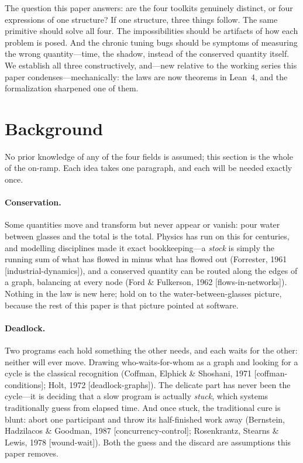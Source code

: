 \documentclass[11pt]{article}
\begin{document}
The question this paper answers: are the four toolkits genuinely
distinct, or four expressions of one structure? If one structure, three
things follow. The same primitive should solve all four. The
impossibilities should be artifacts of how each problem is posed. And
the chronic tuning bugs should be symptoms of measuring the wrong
quantity---time, the shadow, instead of the conserved quantity itself.
We establish all three constructively, and---new relative to the
working series this paper condenses---mechanically: the laws are now
theorems in Lean~4, and the formalization sharpened one of them.

\section{Background}
\label{sec:background}

No prior knowledge of any of the four fields is assumed; this section
is the whole of the on-ramp. Each idea takes one paragraph, and each
will be needed exactly once.

\paragraph{Conservation.} Some quantities move and transform but never
appear or vanish: pour water between glasses and the total is the
total. Physics has run on this for centuries, and modelling
disciplines made it exact bookkeeping---a \emph{stock} is simply the
running sum of what has flowed in minus what has flowed out
(Forrester, 1961 [industrial-dynamics]), and a conserved quantity can
be routed along the edges of a graph, balancing at every node (Ford
\& Fulkerson, 1962 [flows-in-networks]). Nothing in the law is new
here; hold on to the water-between-glasses picture, because the rest
of this paper is that picture pointed at software.

\paragraph{Deadlock.} Two programs each hold something the other
needs, and each waits for the other: neither will ever move. Drawing
who-waits-for-whom as a graph and looking for a cycle is the classical
recognition (Coffman, Elphick \& Shoshani, 1971 [coffman-conditions];
Holt, 1972 [deadlock-graphs]). The delicate part has never been the
cycle---it is deciding that a slow program is actually \emph{stuck},
which systems traditionally guess from elapsed time. And once stuck,
the traditional cure is blunt: abort one participant and throw its
half-finished work away (Bernstein, Hadzilacos \& Goodman, 1987
[concurrency-control]; Rosenkrantz, Stearns \& Lewis, 1978
[wound-wait]). Both the guess and the discard are assumptions this
paper removes.
\end{document}
